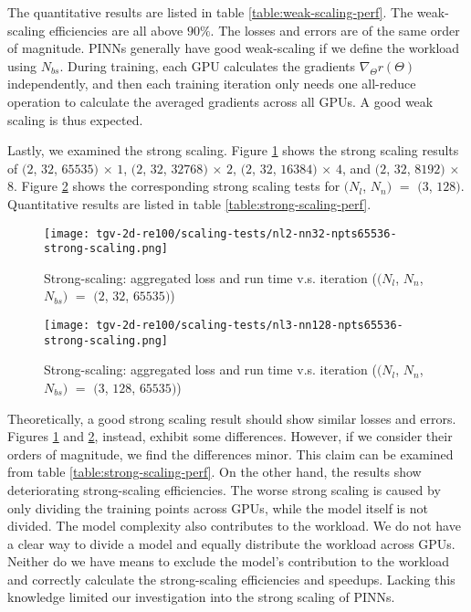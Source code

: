 

The quantitative results are listed in table \ref{table:weak-scaling-perf}.
The weak-scaling efficiencies are all above $90\%$.
The losses and errors are of the same order of magnitude.
PINNs generally have good weak-scaling if we define the workload using $N_{bs}$.
During training, each GPU calculates the gradients $\nabla_{\Theta} r(\Theta)$ independently, and then each training iteration only needs one all-reduce operation to calculate the averaged gradients across all GPUs.
A good weak scaling is thus expected.

Lastly, we examined the strong scaling.
Figure \ref{fig:nl2-nn32-npts65536-strong-scaling} shows the strong scaling results of $(2$, $32$, $65535)$ $\times$ $1$, $(2$, $32$, $32768)$ $\times$ $2$, $(2$, $32$, $16384)$ $\times$ $4$, and $(2$, $32$, $8192)$ $\times$ $8$.
Figure \ref{fig:nl3-nn128-npts65536-strong-scaling} shows the corresponding strong scaling tests for $(N_l$, $N_n)$ $=$ $(3$, $128)$.
Quantitative results are listed in table \ref{table:strong-scaling-perf}. 

\begin{figure}[hbt!]
    \centering%
    \texttt{[image: tgv-2d-re100/scaling-tests/nl2-nn32-npts65536-strong-scaling.png]}
    \caption[%
        Strong-scaling: aggregated loss and run time v.s. iteration ($(N_l$, $N_n$, $N_{bs})$ $=$ $(2$, $32$, $65535)$)%
    ]{%
        Strong-scaling: aggregated loss and run time v.s. iteration ($(N_l$, $N_n$, $N_{bs})$ $=$ $(2$, $32$, $65535)$)%
    }\label{fig:nl2-nn32-npts65536-strong-scaling}
\end{figure}

\begin{figure}[hbt!]
    \centering%
    \texttt{[image: tgv-2d-re100/scaling-tests/nl3-nn128-npts65536-strong-scaling.png]}
    \caption[%
        Strong-scaling: aggregated loss and run time v.s. iteration ($(N_l$, $N_n$, $N_{bs})$ $=$ $(3$, $128$, $65535)$)%
    ]{%
        Strong-scaling: aggregated loss and run time v.s. iteration ($(N_l$, $N_n$, $N_{bs})$ $=$ $(3$, $128$, $65535)$)%
    }\label{fig:nl3-nn128-npts65536-strong-scaling}
\end{figure}

Theoretically, a good strong scaling result should show similar losses and errors.
Figures \ref{fig:nl2-nn32-npts65536-strong-scaling} and \ref{fig:nl3-nn128-npts65536-strong-scaling}, instead, exhibit some differences.
However, if we consider their orders of magnitude, we find the differences minor.
This claim can be examined from table \ref{table:strong-scaling-perf}.
On the other hand, the results show deteriorating strong-scaling efficiencies.
The worse strong scaling is caused by only dividing the training points across GPUs, while the model itself is not divided.  
The model complexity also contributes to the workload.
We do not have a clear way to divide a model and equally distribute the workload across GPUs.
Neither do we have means to exclude the model's contribution to the workload and correctly calculate the strong-scaling efficiencies and speedups.
Lacking this knowledge limited our investigation into the strong scaling of PINNs.


